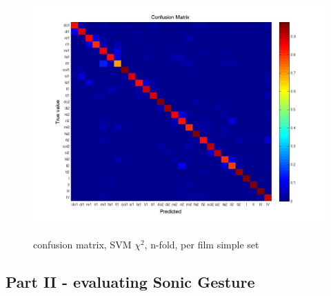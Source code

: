 \begin{figure}[htbp]
\begin{center}
\label{fig:confusion}
\includegraphics[width=\linewidth]{confmat/confusion.jpg}
\end{center}
\caption{confusion matrix, SVM $\chi^2$, n-fold, per film simple set}
\end{figure}




\subsection{Part II - evaluating Sonic Gesture}

